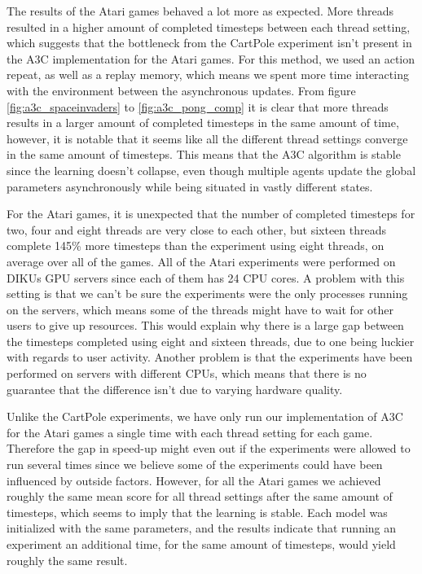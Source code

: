 \documentclass[11pt]{article}
\begin{document}
The results of the Atari games behaved a lot more as expected.
More threads resulted in a higher amount of completed timesteps between each thread setting,
which suggests that the bottleneck from the CartPole experiment isn't present in
the A3C implementation for the Atari games.
For this method, we used an action repeat, as well as a replay memory,
which means we spent more time interacting with the environment
between the asynchronous updates.
From figure \ref{fig:a3c_spaceinvaders} to \ref{fig:a3c_pong_comp}
it is clear that more threads results in a larger amount of completed timesteps
in the same amount of time,
however, it is notable that it seems like all the different thread
settings converge in the same amount of timesteps.
This means that the A3C algorithm is stable since the learning
doesn't collapse, even though multiple agents update the global parameters asynchronously 
while being situated in vastly different states.


For the Atari games, it is unexpected that the number of completed timesteps
for two, four and eight threads are very close to each other, but
sixteen threads complete 145\% more timesteps than the experiment using eight
threads, on average over all of the games.
All of the Atari experiments were performed on DIKUs GPU servers since each of them
has 24 CPU cores.
A problem with this setting is that we can't be sure 
the experiments were the only processes running on the servers, which means
some of the threads might have to wait for other users to
give up resources.
This would explain why there is a large gap between the timesteps
completed using eight and sixteen threads, due to one
being luckier with regards to user activity.
Another problem is that the experiments have been performed on servers with different CPUs,
which means that there is no guarantee that the difference isn't due to
varying hardware quality.

Unlike the CartPole experiments, we have only run our implementation
of A3C for the Atari games a single time with each thread setting for each game.
Therefore the gap in speed-up might even out if the experiments were allowed to run
several times since we believe some of the experiments could have been influenced
by outside factors.
However, for all the Atari games we achieved roughly the same mean score
for all thread settings after the same amount of timesteps,
which seems to imply that the learning is stable.
Each model was initialized
with the same parameters, and the results indicate that running an experiment
an additional time, for the same amount of timesteps,
would yield roughly the same result.
\end{document}

